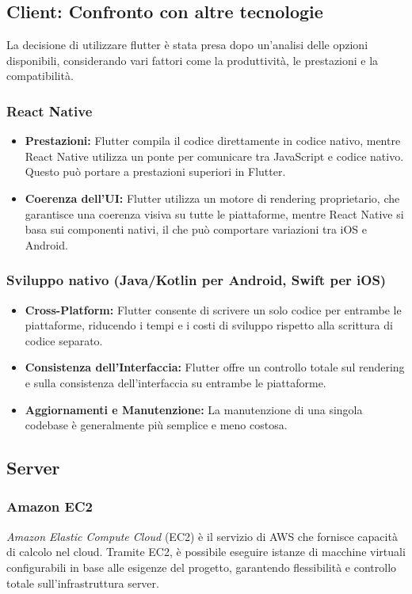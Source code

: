 \subsection{Client: Confronto con altre tecnologie}
La decisione di utilizzare flutter è stata presa dopo un'analisi delle opzioni disponibili, considerando vari fattori come la produttività, le prestazioni e la compatibilità.

\subsubsection{React Native}
\begin{itemize}
	\item \textbf{Prestazioni:} Flutter compila il codice direttamente in codice nativo, mentre React Native utilizza un ponte per comunicare tra JavaScript e codice nativo. Questo può portare a prestazioni superiori in Flutter.
	\item \textbf{Coerenza dell'UI:} Flutter utilizza un motore di rendering proprietario, che garantisce una coerenza visiva su tutte le piattaforme, mentre React Native si basa sui componenti nativi, il che può comportare variazioni tra iOS e Android.
\end{itemize}

\subsubsection{Sviluppo nativo (Java/Kotlin per Android, Swift per iOS)}
\begin{itemize}
	\item \textbf{Cross-Platform:} Flutter consente di scrivere un solo codice per entrambe le piattaforme, riducendo i tempi e i costi di sviluppo rispetto alla scrittura di codice separato.
	\item \textbf{Consistenza dell'Interfaccia:} Flutter offre un controllo totale sul rendering e sulla consistenza dell'interfaccia su entrambe le piattaforme.
	\item \textbf{Aggiornamenti e Manutenzione:} La manutenzione di una singola codebase è generalmente più semplice e meno costosa.
\end{itemize}

\subsection{Server}
\subsubsection{Amazon EC2}
\textit{Amazon Elastic Compute Cloud} (EC2) è il servizio di AWS che fornisce capacità di calcolo nel cloud.
Tramite EC2, è possibile eseguire istanze di macchine virtuali configurabili in base alle esigenze del progetto, garantendo flessibilità e controllo totale sull'infrastruttura server.

